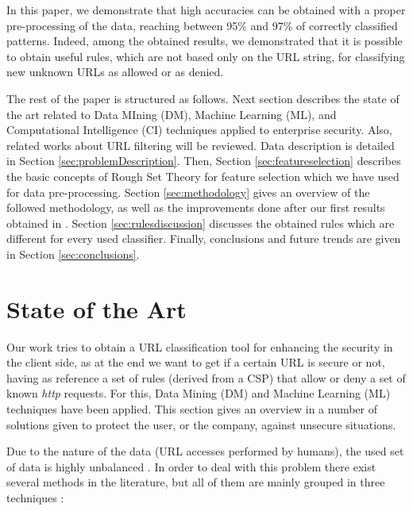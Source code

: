 \documentclass{llncs}
\begin{document}
In this paper, we demonstrate that high accuracies can be obtained with a proper pre-processing of the data, reaching between 95\% and 97\% of correctly classified patterns. Indeed, among the obtained results, we demonstrated that it is possible to obtain useful rules, which are not based only on the URL string, for classifying new unknown URLs as allowed or as denied.


The rest of the paper is structured as follows. Next section describes the state of the art related to Data MIning (DM), Machine Learning (ML), and Computational Intelligence (CI) techniques applied to enterprise security. Also, related works about URL filtering will be reviewed. Data description is detailed in Section \ref{sec:problemDescription}. Then, Section \ref{sec:featureselection} describes the basic concepts of Rough Set Theory for feature selection which we have used for data pre-processing. Section \ref{sec:methodology} gives an overview of the followed methodology, as well as the improvements done after our first results obtained in \cite{ECTA}. Section \ref{sec:rulesdiscussion} discusses the obtained rules which are different for every used classifier. Finally, conclusions and future trends are given in Section \ref{sec:conclusions}. 

%
\section{State of the Art}
\label{sec:stateofart}

\noindent Our work tries to obtain a URL classification tool for enhancing the security in the client side, as at the end we want to get if a certain URL is secure or not, having as reference a set of rules (derived from a CSP) that allow or deny a set of known \textit{http} requests. For this, Data Mining (DM) and Machine Learning (ML) techniques have been applied. This section gives an overview in a number of solutions given to protect the user, or the company, against unsecure situations.

Due to the nature of the data (URL accesses performed by humans), the used set of data is highly unbalanced \cite{imbalanced_data_05}. In order to deal with this problem there exist several methods in the
literature, but all of them are mainly grouped in three techniques
\cite{imbalance_techniques_02}: 
\end{document}
